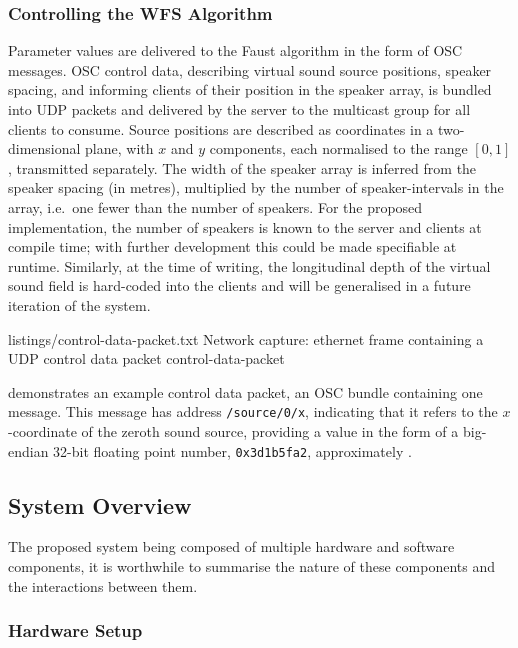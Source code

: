 \subsubsection{Controlling the WFS Algorithm}

Parameter values are delivered to the Faust algorithm in the form of OSC
messages.
OSC control data, describing virtual sound source positions, speaker spacing,
and informing clients of their position in the speaker array, is bundled into
UDP packets and delivered by the server to the multicast group for all clients
to consume.
Source positions are described as coordinates in a two-dimensional plane, with
$x$ and $y$ components, each normalised to the range $[0,1]$, transmitted
separately.
The width of the speaker array is inferred from the speaker spacing (in
metres), multiplied by the number of speaker-intervals in the array, i.e.\ one
fewer than the number of speakers.
For the proposed implementation, the number of speakers is known to the server
and clients at compile time; with further development this could be made
specifiable at runtime.
Similarly, at the time of writing, the longitudinal depth of the virtual
sound field is hard-coded into the clients and will be generalised in a future
iteration of the system.

{listings/control-data-packet.txt}
{Network capture: ethernet frame containing a UDP control data packet}
{control-data-packet}

 demonstrates an example control data
packet, an OSC bundle containing one message.
This message has address \texttt{/source/0/x}, indicating that it refers to the
$x$-coordinate of the zeroth sound source, providing a value in the form of a
big-endian 32-bit floating point number, \texttt{0x3d1b5fa2}, approximately
.

\subsection{System Overview}\label{subsec:system-overview}

The proposed system being composed of multiple hardware and software components,
it is worthwhile to summarise the nature of these components and the
interactions between them.

\subsubsection{Hardware Setup}

